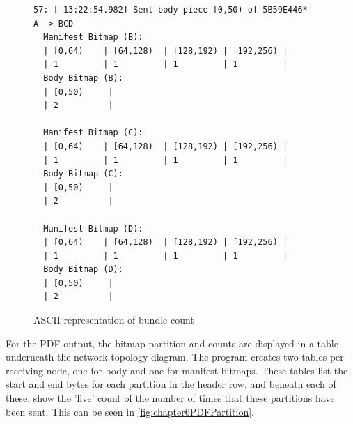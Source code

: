 \begin{figure}
    \begin{centering}
\begin{lstlisting}[basicstyle=\small, frame=single, breaklines]
57: [ 13:22:54.982] Sent body piece [0,50) of 5B59E446*
A -> BCD
  Manifest Bitmap (B):
  | [0,64)    | [64,128)  | [128,192) | [192,256) |
  | 1         | 1         | 1         | 1         |
  Body Bitmap (B):
  | [0,50)     |
  | 2          |
  
  Manifest Bitmap (C):
  | [0,64)    | [64,128)  | [128,192) | [192,256) |
  | 1         | 1         | 1         | 1         |
  Body Bitmap (C):
  | [0,50)     |
  | 2          |
  
  Manifest Bitmap (D):
  | [0,64)    | [64,128)  | [128,192) | [192,256) |
  | 1         | 1         | 1         | 1         |
  Body Bitmap (D):
  | [0,50)     |
  | 2          |
\end{lstlisting}
        \caption{ASCII representation of bundle count}
        \label{fig:chapter6ASCIIPartition}
    \end{centering}
\end{figure}

For the PDF output, the bitmap partition and counts are displayed in a table underneath the network topology diagram.
The program creates two tables per receiving node, one for body and one for manifest bitmaps.
These tables list the start and end bytes for each partition in the header row, and beneath each of these, show the 'live' count of the number of times that these partitions have been sent.
This can be seen in \figurename{ \ref{fig:chapter6PDFPartition}}.

